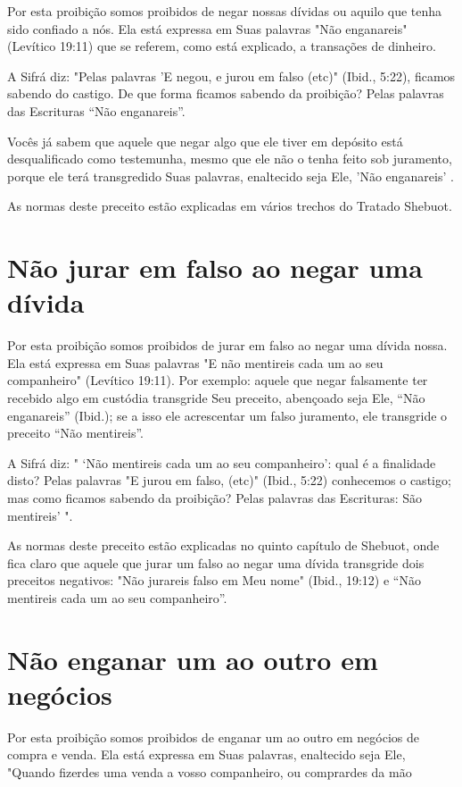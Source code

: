 Por esta proibição somos proibidos de negar nossas dívidas ou aqui­lo
que tenha sido confiado a nós. Ela está expressa em Suas palavras "Não
en­ganareis" (Levítico 19:11) que se referem, como está explicado, a
transações de dinheiro.

A Sifrá diz: "Pelas palavras 'E negou, e jurou em falso (etc)" (Ibid.,
5:22), ficamos sabendo do castigo. De que forma ficamos sabendo da
proibi­ção? Pelas palavras das Escrituras ``Não enganareis''.

Vocês já sabem que aquele que negar algo que ele tiver em depósito está
desqualificado como testemunha, mesmo que ele não o tenha feito sob
juramento, porque ele terá transgredido Suas palavras, enaltecido seja
Ele, 'Não enganareis' .

As normas deste preceito estão explicadas em vários trechos do Tra­tado
Shebuot.

\section{Não jurar em falso ao negar uma dívida}

Por esta proibição somos proibidos de jurar em falso ao negar uma dívida
nossa. Ela está expressa em Suas palavras "E não mentireis cada um ao
seu companheiro" (Levítico 19:11). Por exemplo: aquele que negar
falsamente ter recebido algo em custódia transgride Seu preceito,
abençoado seja Ele, ``Não enganareis'' (Ibid.); se a isso ele acrescentar
um falso juramento, ele transgride o preceito ``Não mentireis''.

A Sifrá diz: " `Não mentireis cada um ao seu companheiro': qual é a
finalidade disto? Pelas palavras "E jurou em falso, (etc)" (Ibid., 5:22)
conhe­cemos o castigo; mas como ficamos sabendo da proibição? Pelas
palavras das Escrituras: São mentireis' ".

As normas deste preceito estão explicadas no quinto capítulo de
She­buot, onde fica claro que aquele que jurar um falso ao negar uma
dívida trans­gride dois preceitos negativos: "Não jurareis falso em Meu
nome" (Ibid., 19:12) e ``Não mentireis cada um ao seu companheiro''.

\section{Não enganar um ao outro em negócios}

Por esta proibição somos proibidos de enganar um ao outro em ne­gócios
de compra e venda. Ela está expressa em Suas palavras, enaltecido seja
Ele, "Quando fizerdes uma venda a vosso companheiro, ou comprardes da
mão

